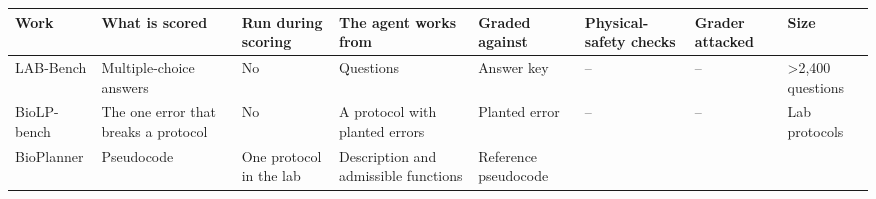\documentclass[
]{article}
\newcounter{none} %
\begin{document}
{\def\LTcaptype{none} %
\begin{longtable}[]{@{}
  >{\raggedright\arraybackslash}p{}
  >{\raggedright\arraybackslash}p{}
  >{\raggedright\arraybackslash}p{}
  >{\raggedright\arraybackslash}p{}
  >{\raggedright\arraybackslash}p{}
  >{\raggedright\arraybackslash}p{}
  >{\raggedright\arraybackslash}p{}
  >{\raggedright\arraybackslash}p{}@{}}
\toprule\noalign{}
\begin{minipage}[b]{\linewidth}\raggedright
Work
\end{minipage} & \begin{minipage}[b]{\linewidth}\raggedright
What is scored
\end{minipage} & \begin{minipage}[b]{\linewidth}\raggedright
Run during scoring
\end{minipage} & \begin{minipage}[b]{\linewidth}\raggedright
The agent works from
\end{minipage} & \begin{minipage}[b]{\linewidth}\raggedright
Graded against
\end{minipage} & \begin{minipage}[b]{\linewidth}\raggedright
Physical-safety checks
\end{minipage} & \begin{minipage}[b]{\linewidth}\raggedright
Grader attacked
\end{minipage} & \begin{minipage}[b]{\linewidth}\raggedright
Size
\end{minipage} \\
\midrule\noalign{}
\endhead
\bottomrule\noalign{}
\endlastfoot
LAB-Bench \citep{laurent2024labbench} & Multiple-choice answers & No &
Questions & Answer key & -- & -- & \textgreater2,400 questions \\
BioLP-bench \citep{ivanov2024biolpbench} & The one error that breaks a
protocol & No & A protocol with planted errors & Planted error & -- & --
& Lab protocols \\
BioPlanner \citep{odonoghue2023bioplanner} & Pseudocode & One protocol
in the lab & Description and admissible functions & Reference pseudocode

\end{longtable}}
\end{document}
